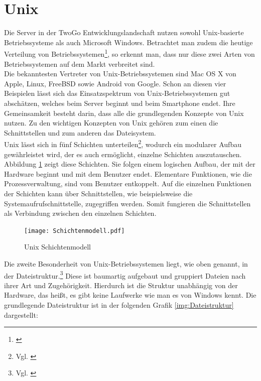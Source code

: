 \section{Unix}
Die Server in der TwoGo Entwicklungslandschaft nutzen sowohl Unix-basierte Betriebssysteme als auch Microsoft Windows. Betrachtet man zudem die heutige Verteilung von Betriebssystemen\footnote{\cite{Umfrage_OS}}, so erkennt man, dass nur diese zwei Arten von Betriebssystemen auf dem Markt verbreitet sind.\\
Die bekanntesten Vertreter von Unix-Betriebssystemen sind Mac OS X von Apple, Linux, FreeBSD sowie Android von Google. Schon an diesen vier Beispielen lässt sich das Einsatzspektrum von Unix-Betriebssystemen gut abschätzen, welches beim Server beginnt und beim Smartphone endet. Ihre Gemeinsamkeit besteht darin, dass alle die grundlegenden Konzepte von Unix nutzen. Zu den wichtigen Konzepten von Unix gehören zum einen die Schnittstellen und zum anderen das Dateisystem. \\
Unix lässt sich in fünf Schichten unterteilen\footnote{Vgl. \cite[Seite 11ff]{systemprogrammierung_2011}}, wodurch ein  modularer Aufbau gewährleistet wird, der es auch ermöglicht, einzelne Schichten auszutauschen. Abbildung \ref{img:Schichtenmodell} zeigt diese Schichten. Sie folgen einem logischen Aufbau, der  mit der Hardware beginnt und  mit dem Benutzer endet. Elementare Funktionen, wie die Prozessverwaltung, sind vom Benutzer entkoppelt. Auf die einzelnen Funktionen der Schichten kann über Schnittstellen, wie beispielsweise die Systemaufrufschnittstelle, zugegriffen werden. Somit fungieren die Schnittstellen als Verbindung zwischen den einzelnen Schichten.

\begin{figure}[H]
    \centering
    \texttt{[image: Schichtenmodell.pdf]}
    \vspace{-10pt}
    \caption{Unix Schichtenmodell} \cite[Seite 12]{systemprogrammierung_2011}
    \vspace{-20pt}
  \label{img:Schichtenmodell}
\end{figure}

Die zweite Besonderheit von Unix-Betriebssystemen liegt, wie oben genannt, in der Dateistruktur.\footnote{Vgl. \cite[Seite 7ff]{burtch_linux_2004}}  Diese ist baumartig aufgebaut und gruppiert Dateien nach ihrer Art und Zugehörigkeit. Hierdurch ist die Struktur unabhängig von der Hardware, das heißt, es gibt keine Laufwerke wie man es von Windows kennt. Die grundlegende Dateistruktur ist in der folgenden Grafik \ref{img:Dateistruktur} dargestellt:

